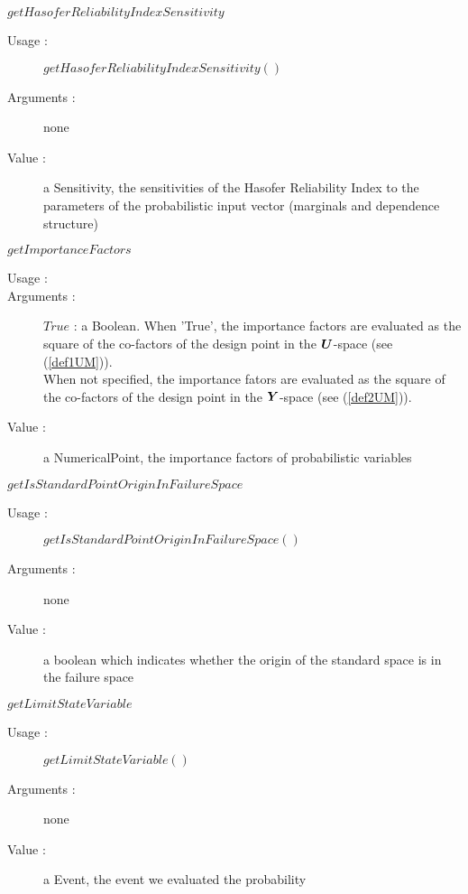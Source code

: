\begin{description}
\begin{description}
  \item $getHasoferReliabilityIndexSensitivity$
    \begin{description}
    \item[Usage :] $getHasoferReliabilityIndexSensitivity()$
    \item[Arguments :] none
    \item[Value :]  a Sensitivity, the sensitivities of the Hasofer Reliability Index to the parameters of the probabilistic input vector (marginals and dependence structure)
    \end{description}
    \bigskip

  \item $getImportanceFactors$
    \begin{description}
    \item[Usage :] \rule{0pt}{1em}
    \item[Arguments :] $True$ : a Boolean. When 'True', the importance factors are evaluated as the square of the co-factors of the design point in the ${\boldsymbol{U}}$-space (see (\ref{def1UM})).\\
 When not specified, the importance fators are  evaluated as the square of the co-factors of the design point in the ${\boldsymbol{Y}}$-space (see (\ref{def2UM})).
    \item[Value :]  a NumericalPoint, the importance factors of probabilistic variables
    \end{description}
    \bigskip

  \item $getIsStandardPointOriginInFailureSpace$
    \begin{description}
    \item[Usage :] $getIsStandardPointOriginInFailureSpace()$
    \item[Arguments :] none
    \item[Value :]  a boolean which indicates whether the origin of the standard space is in the failure space
    \end{description}
    \bigskip

  \item $getLimitStateVariable$
    \begin{description}
    \item[Usage :] $getLimitStateVariable()$
    \item[Arguments :] none
    \item[Value :]  a Event, the event we evaluated the probability
    \end{description}
    \bigskip


\end{description}
\end{description}
